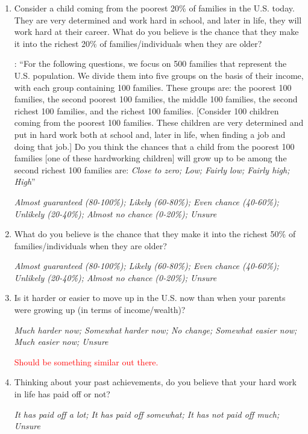 \documentclass[11pt, headsepline]{article}
\newcommand{\red}[1]{\textcolor{red}{#1}}
\newcommand{\green}[1]{\textcolor{sharpgreen}{#1}}
\begin{document}
\begin{enumerate}[resume]

    \item Consider a child coming from the poorest 20\% of families in the U.S. today. They are very determined and work hard in school, and later in life, they will work hard at their career. What do you believe is the chance that they make it into the richest 20\% of families/individuals when they are older?

    \green{\cite{alesina2018intergenerational}: ``For the following questions, we focus on 500 families that represent the U.S. population. We divide them into five groups on the basis of their income, with each group containing 100 families. These groups are: the poorest 100 families, the second poorest 100 families, the middle 100 families, the second richest 100 families, and the richest 100 families. [Consider 100 children coming from the poorest 100 families. These children are very determined and put in hard work both at school and, later in life, when finding a job and doing that job.] Do you think the chances that a child from the poorest 100 families [one of these hardworking children] will grow up to be among the second richest 100 families are: \textit{Close to zero; Low; Fairly low; Fairly high; High}''}

    \textit{Almost guaranteed (80-100\%); Likely (60-80\%); Even chance (40-60\%); Unlikely (20-40\%); Almost no chance (0-20\%); Unsure}

    \item What do you believe is the chance that they make it into the richest 50\% of families/individuals when they are older?

    \textit{Almost guaranteed (80-100\%); Likely (60-80\%); Even chance (40-60\%); Unlikely (20-40\%); Almost no chance (0-20\%); Unsure}

    \item Is it harder or easier to move up in the U.S. now than when your parents were growing up (in terms of income/wealth)?

    \textit{Much harder now; Somewhat harder now; No change; Somewhat easier now; Much easier now; Unsure}

    \red{Should be something similar out there.}

    \item Thinking about your past achievements, do you believe that your hard work in life has paid off or not?

    \textit{It has paid off a lot; It has paid off somewhat; It has not paid off much; Unsure}


\end{enumerate}
\end{document}
